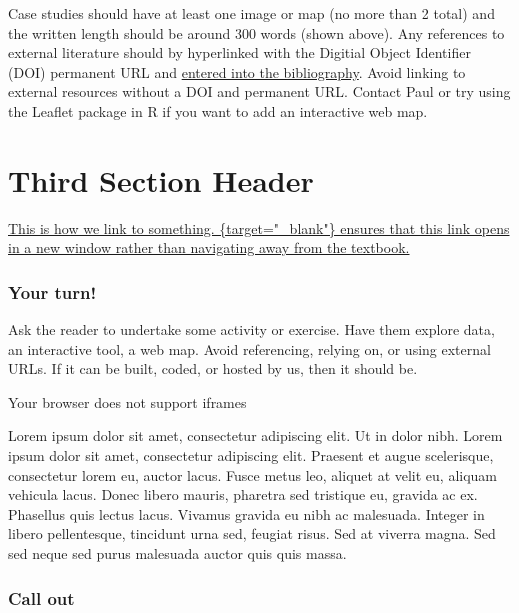 \documentclass[
]{book}
\begin{document}
Case studies should have at least one image or map (no more than 2 total) and the written length should be around 300 words (shown above). Any references to external literature should by hyperlinked with the Digitial Object Identifier (DOI) permanent URL and \href{https://bookdown.org/yihui/bookdown/citations.html}{entered into the bibliography}. Avoid linking to external resources without a DOI and permanent URL. Contact Paul or try using the Leaflet package in R if you want to add an interactive web map.

\hypertarget{third-section-header}{%
\section{Third Section Header}\label{third-section-header}}

\href{https://google.com}{This is how we link to something. \{target="\_blank"\} ensures that this link opens in a new window rather than navigating away from the textbook.}

\hypertarget{your-turn-1}{%
\subsubsection*{Your turn!}\label{your-turn-1}}

Ask the reader to undertake some activity or exercise. Have them explore data, an interactive tool, a web map. Avoid referencing, relying on, or using external URLs. If it can be built, coded, or hosted by us, then it should be.

Your browser does not support iframes

Lorem ipsum dolor sit amet, consectetur adipiscing elit. Ut in dolor nibh. Lorem ipsum dolor sit amet, consectetur adipiscing elit. Praesent et augue scelerisque, consectetur lorem eu, auctor lacus. Fusce metus leo, aliquet at velit eu, aliquam vehicula lacus. Donec libero mauris, pharetra sed tristique eu, gravida ac ex. Phasellus quis lectus lacus. Vivamus gravida eu nibh ac malesuada. Integer in libero pellentesque, tincidunt urna sed, feugiat risus. Sed at viverra magna. Sed sed neque sed purus malesuada auctor quis quis massa.

\hypertarget{call-out}{%
\subsubsection*{Call out}\label{call-out}}
\end{document}
